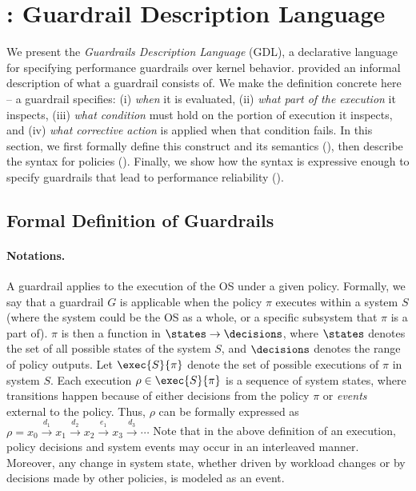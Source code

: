 \section{\lang: Guardrail Description Language}\label{sec:gdl}

We present the \emph{Guardrails Description Language} (GDL), a declarative language for specifying performance guardrails over kernel behavior.
 provided an informal description of what a guardrail consists of. We make the definition concrete here -- a guardrail specifies: (i) \emph{when} it is evaluated, (ii) \emph{what part of the execution} it inspects, (iii) \emph{what condition} must hold on the portion of execution it inspects, and (iv) \emph{what corrective action} is applied when that condition fails.
In this section, we first formally define this construct and its semantics (), then describe the syntax for \lang policies (). Finally, we show how the \lang syntax is expressive enough to specify guardrails that lead to performance reliability ().  

\subsection{Formal Definition of Guardrails}
\label{subsec:formal-guardrails}

\paragraph{Notations.}
A guardrail applies to the execution of the OS under a given policy.
Formally, we say that a guardrail $G$ is applicable when the policy $\pi$ executes within a system $S$ (where the system could be the OS as a whole, or a specific subsystem that $\pi$ is a part of).
$\pi$ is then a function in $\states\rightarrow\decisions$, where $\states$ denotes the set of all possible states of the system $S$, and $\decisions$ denotes the range of policy outputs.
Let $\exec{S}{\pi}$ denote the set of possible executions of $\pi$ in system $S$.
Each execution $\rho \in \exec{S}{\pi}$ is a sequence of system states, where transitions happen because of either decisions from the policy $\pi$ or {\it events} external to the policy. Thus, $\rho$ can be formally expressed as 
\(
\rho = x_0 \xrightarrow{d_1} x_1 \xrightarrow{d_2} x_2 \xrightarrow{e_1} x_3 \xrightarrow{d_3} \cdots
\)
Note that in the above definition of an execution, policy decisions and system events may occur in an interleaved manner. Moreover, any change in system state, whether driven by workload changes or by decisions made by other policies, is modeled as an event.

